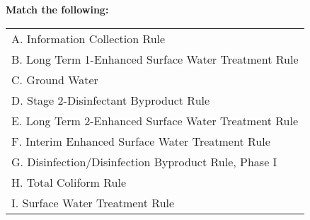 \documentclass[10pt]{article}
\begin{document}
\textbf{Match the following:}\\
\begin{table}[ht]
\renewcommand{\arraystretch}{2.4}
\scriptsize
\begin{tabular}{p{5cm}}
A. Information Collection Rule                       \\

B.  Long Term 1-Enhanced Surface Water Treatment Rule \\

C.  Ground Water                                      \\

D.  Stage 2-Disinfectant Byproduct Rule               \\

E. Long Term 2-Enhanced Surface Water Treatment Rule \\

F. Interim Enhanced Surface Water Treatment Rule     \\

G. Disinfection/Disinfection Byproduct Rule, Phase I \\

H. Total Coliform Rule                               \\

I. Surface Water Treatment Rule                      \\


\end{tabular}
\end{table}
\end{document}
